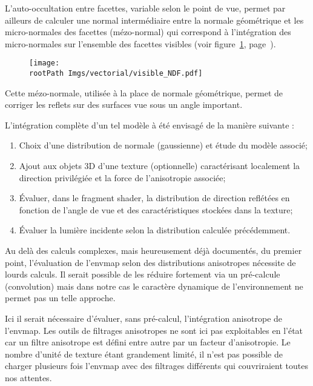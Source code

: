 \documentclass[10pt,a4paper,twoside, twocolumn]{report}
\newcommand*{\rootPath}{../}
\begin{document}
L’auto-occultation entre facettes, variable selon le point de vue, permet par ailleurs de calculer une normal intermédiaire entre la normale géométrique et les micro-normales des facettes (mézo-normal) qui correspond à l’intégration des micro-normales sur l’ensemble des facettes visibles (voir figure~\ref{fig:svg:mezonormales}, page~\pageref{fig:svg:mezonormales}).

\begin{figure}\centering
	\texttt{[image: \\rootPath Imgs/vectorial/visible\_NDF.pdf]}
	\label{fig:svg:mezonormales}
\end{figure}

Cette mézo-normale, utilisée à la place de normale géométrique, permet de corriger les reflets sur des surfaces vue sous un angle important.

L’intégration complète d’un tel modèle à été envisagé de la manière suivante :
\begin{enumerate}
	\item Choix d’une distribution de normale (gaussienne) et étude du modèle associé;
	\item Ajout aux objets 3D d’une texture (optionnelle) caractérisant localement la direction privilégiée et la force de l’anisotropie associée;
	\item Évaluer, dans le fragment shader, la distribution de direction reflétées en fonction de l’angle de vue et des caractéristiques stockées dans la texture;
	\item Évaluer la lumière incidente selon la distribution calculée précédemment.
\end{enumerate}

Au delà des calculs complexes, mais heureusement déjà documentés, du premier point\cite{Heitz2013a}, l’évaluation de l’envmap selon des distributions anisotropes nécessite de lourds calculs.
Il serait possible de les réduire fortement via un pré-calcule (convolution) mais dans notre cas le caractère dynamique de l’environnement ne permet pas un telle approche.

Ici il serait nécessaire d’évaluer, sans pré-calcul, l’intégration anisotrope de l’envmap.
Les outils de filtrages anisotropes ne sont ici pas exploitables en l’état car un filtre anisotrope est défini entre autre par un facteur d’anisotropie. Le nombre d’unité de texture étant grandement limité, il n’est pas possible de charger plusieurs fois l’envmap avec des filtrages différents qui couvriraient toutes nos attentes.
\end{document}
